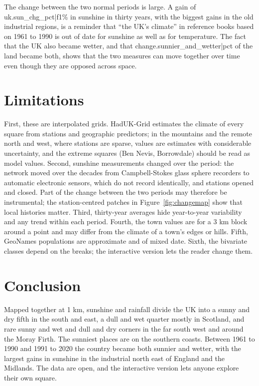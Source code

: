 \documentclass[11pt,a4paper]{article}
\begin{document}
The change between the two normal periods is large. A gain of {{uk.sun_chg_pct|f1}}\% in sunshine in thirty years, with the biggest gains in the old industrial regions, is a reminder that ``the UK's climate'' in reference books based on 1961 to 1990 is out of date for sunshine as well as for temperature. The fact that the UK also became wetter, and that {{change.sunnier_and_wetter|pct}} of the land became both, shows that the two measures can move together over time even though they are opposed across space.

\section{Limitations}

First, these are interpolated grids. HadUK-Grid estimates the climate of every square from stations and geographic predictors; in the mountains and the remote north and west, where stations are sparse, values are estimates with considerable uncertainty, and the extreme squares (Ben Nevis, Borrowdale) should be read as model values. Second, sunshine measurements changed over the period: the network moved over the decades from Campbell-Stokes glass sphere recorders to automatic electronic sensors, which do not record identically, and stations opened and closed. Part of the change between the two periods may therefore be instrumental; the station-centred patches in Figure~\ref{fig:changemap} show that local histories matter. Third, thirty-year averages hide year-to-year variability and any trend within each period. Fourth, the town values are for a 3 km block around a point and may differ from the climate of a town's edges or hills. Fifth, GeoNames populations are approximate and of mixed date. Sixth, the bivariate classes depend on the breaks; the interactive version lets the reader change them.

\section{Conclusion}

Mapped together at 1 km, sunshine and rainfall divide the UK into a sunny and dry fifth in the south and east, a dull and wet quarter mostly in Scotland, and rare sunny and wet and dull and dry corners in the far south west and around the Moray Firth. The sunniest places are on the southern coasts. Between 1961 to 1990 and 1991 to 2020 the country became both sunnier and wetter, with the largest gains in sunshine in the industrial north east of England and the Midlands. The data are open, and the interactive version lets anyone explore their own square.
\end{document}
